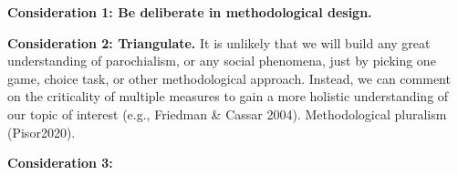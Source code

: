 \documentclass[bibauthoryear]{aa}
\begin{document}
\textbf{Consideration 1: Be deliberate in methodological design.}

\textbf{Consideration 2: Triangulate.} It is unlikely that we will build any great understanding of parochialism, or any social phenomena, just by picking one game, choice task, or other methodological approach. Instead, we can comment on the criticality of multiple measures to gain a more holistic understanding of our topic of interest (e.g., Friedman \& Cassar 2004). Methodological pluralism (Pisor2020). 

\textbf{Consideration 3: }


\end{document}
